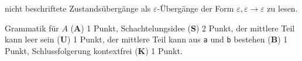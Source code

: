 \begin{loesung}
\begin{center}
\end{center}
nicht beschriftete Zustandsübergänge als $\varepsilon$-Übergänge der
Form $\varepsilon,\varepsilon\to\varepsilon$ zu lesen.
\end{loesung}

\begin{bewertung}
Grammatik für $A$ ({\bf A}) 1 Punkt,
Schachtelungsidee ({\bf S}) 2 Punkt,
der mittlere Teil kann leer sein ({\bf U}) 1 Punkt,
der mittlere Teil kann aus \texttt{a} und \texttt{b} bestehen ({\bf B}) 1 Punkt,
Schlussfolgerung kontextfrei ({\bf K}) 1 Punkt.
\end{bewertung}

